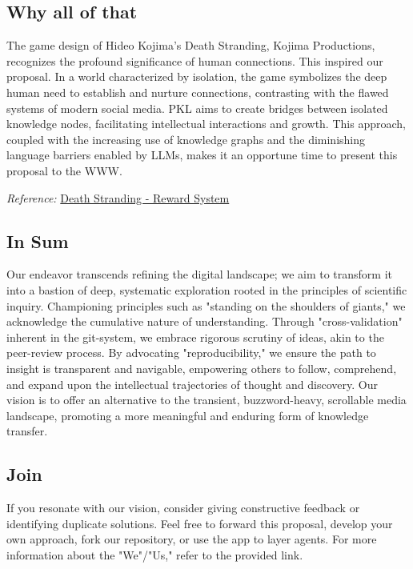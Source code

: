 \documentclass[11pt, a4paper]{article}
\begin{document}
    \begin{gitbox}
        \section*{Why all of that}
        The game design of Hideo Kojima's Death Stranding, Kojima Productions, recognizes the profound significance of human connections. This inspired our proposal. In a world characterized by isolation, the game symbolizes the deep human need to establish and nurture connections, contrasting with the flawed systems of modern social media. PKL aims to create bridges between isolated knowledge nodes, facilitating intellectual interactions and growth. This approach, coupled with the increasing use of knowledge graphs and the diminishing language barriers enabled by LLMs, makes it an opportune time to present this proposal to the WWW.

        \textit{Reference:} \href{https://www.youtube.com/watch?v=FFtYXoOowKQ}{Death Stranding - Reward System}
    \end{gitbox}

    \begin{gitbox}
        \section*{In Sum}
        Our endeavor transcends refining the digital landscape; we aim to transform it into a bastion of deep, systematic exploration rooted in the principles of scientific inquiry. Championing principles such as "standing on the shoulders of giants," we acknowledge the cumulative nature of understanding. Through "cross-validation" inherent in the git-system, we embrace rigorous scrutiny of ideas, akin to the peer-review process. By advocating "reproducibility," we ensure the path to insight is transparent and navigable, empowering others to follow, comprehend, and expand upon the intellectual trajectories of thought and discovery. Our vision is to offer an alternative to the transient, buzzword-heavy, scrollable media landscape, promoting a more meaningful and enduring form of knowledge transfer.
    \end{gitbox}

    \begin{gitbox}
        \section*{Join}
        If you resonate with our vision, consider giving constructive feedback or identifying duplicate solutions. Feel free to forward this proposal, develop your own approach, fork our repository, or use the app to layer agents. For more information about the "We"/"Us," refer to the provided link.
    \end{gitbox}
\end{document}
